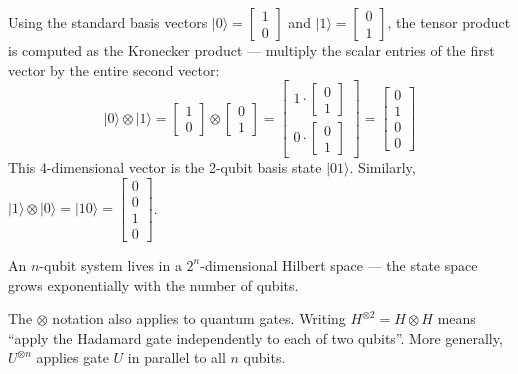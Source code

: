 \begin{example}
Using the standard basis vectors $|0\rangle = \begin{bmatrix}1\\0\end{bmatrix}$ and $|1\rangle = \begin{bmatrix}0\\1\end{bmatrix}$, the tensor product is computed as the Kronecker product — multiply the scalar entries of the first vector by the entire second vector:
\[
|0\rangle \otimes |1\rangle = \begin{bmatrix}1\\0\end{bmatrix} \otimes \begin{bmatrix}0\\1\end{bmatrix} = \begin{bmatrix}1\cdot\begin{bmatrix}0\\1\end{bmatrix}\\[4pt] 0\cdot\begin{bmatrix}0\\1\end{bmatrix}\end{bmatrix} = \begin{bmatrix}0\\1\\0\\0\end{bmatrix}
\]
This 4-dimensional vector is the 2-qubit basis state $|01\rangle$. Similarly, $|1\rangle \otimes |0\rangle = |10\rangle = \begin{bmatrix}0\\0\\1\\0\end{bmatrix}$.

An $n$-qubit system lives in a $2^n$-dimensional Hilbert space — the state space grows exponentially with the number of qubits.
\end{example}

\begin{remark}
The $\otimes$ notation also applies to quantum gates. Writing $H^{\otimes 2} = H \otimes H$ means ``apply the Hadamard gate independently to each of two qubits''. More generally, $U^{\otimes n}$ applies gate $U$ in parallel to all $n$ qubits.
\end{remark}

